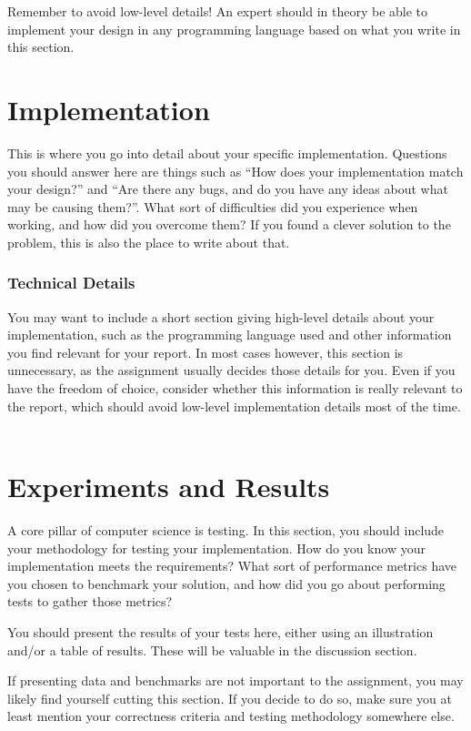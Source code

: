 \documentclass{article}
\begin{document}
\begin{flushleft}
\bigskip

Remember to avoid low-level details! An expert should in theory be able to implement your design in any programming language based on what you write in this section.

\section{Implementation}
This is where you go into detail about your specific implementation. Questions you should answer here are things such as ``How does your implementation match your design?'' and ``Are there any bugs, and do you have any ideas about what may be causing them?''. What sort of difficulties did you experience when working, and how did you overcome them? If you found a clever solution to the problem, this is also the place to write about that.

\subsubsection{Technical Details}
You may want to include a short section giving high-level details about your implementation, such as the programming language used and other information you find relevant for your report. In most cases however, this section is unnecessary, as the assignment usually decides those details for you. Even if you have the freedom of choice, consider whether this information is really relevant to the report, which should avoid low-level implementation details most of the time. \ 

\section{Experiments and Results}
A core pillar of computer science is testing. In this section, you should include your methodology for testing your implementation. How do you know your implementation meets the requirements? What sort of performance metrics have you chosen to benchmark your solution, and how did you go about performing tests to gather those metrics?

\bigskip

You should present the results of your tests here, either using an illustration and/or a table of results. These will be valuable in the discussion section.

\bigskip

If presenting data and benchmarks are not important to the assignment, you may likely find yourself cutting this section. If you decide to do so, make sure you at least mention your correctness criteria and testing methodology somewhere else.


\end{flushleft}
\end{document}
